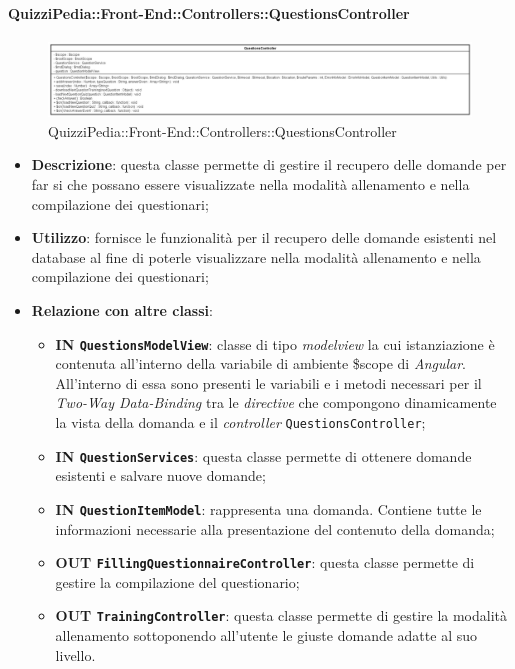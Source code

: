 \paragraph{QuizziPedia::Front-End::Controllers::QuestionsController}
\begin{figure} [ht]
	\centering
	\includegraphics[scale=0.25]{UML/Classi/Front-End/QuizziPedia_Front-end_Controller_QuestionsController.png}
	\caption{QuizziPedia::Front-End::Controllers::QuestionsController}
\end{figure} \FloatBarrier
\begin{itemize}
	\item \textbf{Descrizione}: questa classe permette di gestire il recupero delle domande per far si che possano essere visualizzate nella modalità allenamento e nella compilazione dei questionari;
	\item \textbf{Utilizzo}: fornisce le funzionalità per il recupero delle domande esistenti nel database al fine di poterle visualizzare nella modalità allenamento e nella compilazione dei questionari;
	\item \textbf{Relazione con altre classi}:
	\begin{itemize}
		\item \textbf{IN \texttt{QuestionsModelView}}: classe di tipo \textit{modelview} la cui istanziazione è contenuta all'interno della variabile di ambiente \$scope di \textit{Angular}. All'interno di essa sono presenti le variabili e i metodi necessari per il \textit{Two-Way Data-Binding} tra le \textit{directive} che compongono dinamicamente la vista della domanda e il \textit{controller} \texttt{QuestionsController};
		\item \textbf{IN \texttt{QuestionServices}}: questa classe permette di ottenere domande esistenti e salvare nuove domande;
		\item \textbf{IN \texttt{QuestionItemModel}}: rappresenta una domanda. Contiene tutte le informazioni necessarie alla presentazione del contenuto della domanda;
		\item \textbf{OUT \texttt{FillingQuestionnaireController}}: questa classe permette di gestire la compilazione del questionario;
		\item \textbf{OUT \texttt{TrainingController}}: questa classe permette di gestire la modalità allenamento sottoponendo all'utente le giuste domande adatte al suo livello.

\end{itemize}
\end{itemize}
